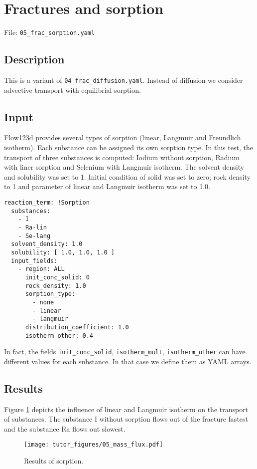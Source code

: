 \section{Fractures and sorption}

File: \texttt{05\_frac\_sorption.yaml}

\subsection{Description}

This is a variant of \texttt{04\_frac\_diffusion.yaml}. Instead of
diffusion we consider advective transport with equilibrial sorption.

\subsection{Input}

Flow123d provides several types of sorption (linear, Langmuir and
Freundlich isotherm). Each substance can be assigned its own sorption
type. In this test, the transport of three substances is computed:
Iodium without sorption, Radium with liner sorption and Selenium with
Langmuir isotherm. The solvent density and solubility was set to 1.
Initial condition of solid was set to zero; rock density to 1 and
parameter of linear and Langmuir isotherm was set to 1.0.

\begin{verbatim}
reaction_term: !Sorption
  substances:
    - I
    - Ra-lin
    - Se-lang
  solvent_density: 1.0
  solubility: [ 1.0, 1.0, 1.0 ]
  input_fields:
    - region: ALL
      init_conc_solid: 0
      rock_density: 1.0
      sorption_type:
        - none           
        - linear           
        - langmuir
      distribution_coefficient: 1.0
      isotherm_other: 0.4
\end{verbatim}

In fact, the fields \texttt{init\_conc\_solid}, \texttt{isotherm\_mult},
\texttt{isotherm\_other} can have different values for each substance.
In that case we define them as YAML arrays.

\subsection{Results}

Figure \ref{fig:sorp_res} depicts the influence of linear and Langmuir
isotherm on the transport of substances. The substance I without
sorption flows out of the fracture fastest and the substance Ra flows
out slowest.

\begin{figure}
\hypertarget{fig:sorp_res}{%
\centering
\texttt{[image: tutor\_figures/05\_mass\_flux.pdf]}
\caption{Results of sorption.}\label{fig:sorp_res}
}
\end{figure}

